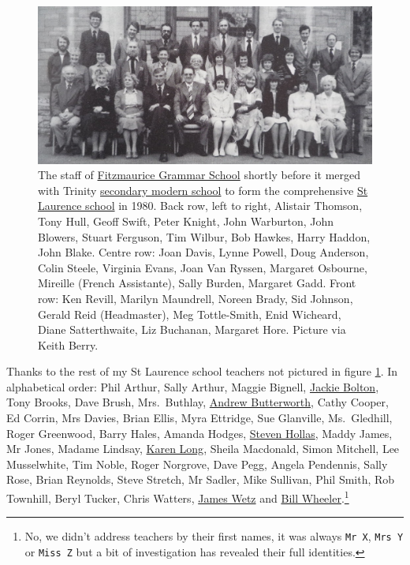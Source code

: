 \documentclass[
]{book}
\begin{document}
\begin{figure}

{\centering \includegraphics[width=1\linewidth]{images/fitzmaurice-grammar-school} 

}

\caption{The staff of \href{https://en.wikipedia.org/wiki/Fitzmaurice_Grammar_School}{Fitzmaurice Grammar School} shortly before it merged with Trinity \href{https://en.wikipedia.org/wiki/Secondary_modern_school}{secondary modern school} to form the comprehensive \href{https://en.wikipedia.org/wiki/St_Laurence_School}{St Laurence school} in 1980. Back row, left to right, Alistair Thomson, Tony Hull, Geoff Swift, Peter Knight, John Warburton, John Blowers, Stuart Ferguson, Tim Wilbur, Bob Hawkes, Harry Haddon, John Blake. Centre row: Joan Davis, Lynne Powell, Doug Anderson, Colin Steele, Virginia Evans, Joan Van Ryssen, Margaret Osbourne, Mireille (French Assistante), Sally Burden, Margaret Gadd. Front row: Ken Revill, Marilyn Maundrell, Noreen Brady, Sid Johnson, Gerald Reid (Headmaster), Meg Tottle-Smith, Enid Wicheard, Diane Satterthwaite, Liz Buchanan, Margaret Hore. Picture via Keith Berry. \citep{bradfordonavon}}\label{fig:fitzmaurice-fig}
\end{figure}



Thanks to the rest of my St Laurence school teachers not pictured in figure \ref{fig:fitzmaurice-fig}. In alphabetical order: Phil Arthur, Sally Arthur, Maggie Bignell, \href{https://www.wiltshiretimes.co.uk/news/11774162.the-life-of-mrs-jackie-bolton/}{Jackie Bolton}, Tony Brooks, Dave Brush, Mrs.~Buthlay, \href{https://www.youtube.com/watch?v=Hg9irmFwFr8}{Andrew Butterworth}, Cathy Cooper, Ed Corrin, Mrs Davies, Brian Ellis, Myra Ettridge, Sue Glanville, Ms.~Gledhill, Roger Greenwood, Barry Hales, Amanda Hodges, \href{https://www.bathminervachoir.co.uk/our-accompanist}{Steven Hollas}, Maddy James, Mr Jones, Madame Lindsay, \href{https://www.amazon.co.uk/Karen-Long/e/B00NMARBTS}{Karen Long}, Sheila Macdonald, Simon Mitchell, Lee Musselwhite, Tim Noble, Roger Norgrove, Dave Pegg, Angela Pendennis, Sally Rose, Brian Reynolds, Steve Stretch, Mr Sadler, Mike Sullivan, Phil Smith, Rob Townhill, Beryl Tucker, Chris Watters, \href{https://www.sourcewatch.org/index.php/James_Wetz}{James Wetz} and \href{https://www.gazetteandherald.co.uk/news/7412797.school-marks-25th-with-street-party/}{Bill Wheeler}.\footnote{No, we didn't address teachers by their first names, it was always \texttt{Mr\ X}, \texttt{Mrs\ Y} or \texttt{Miss\ Z} but a bit of investigation has revealed their full identities.}
\end{document}
